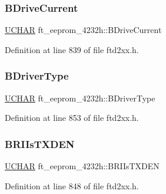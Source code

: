 \subsubsection{\texorpdfstring{B\+Drive\+Current}{BDriveCurrent}}
{\footnotesize\ttfamily \hyperlink{CatCaloProto40MHz_2inc_2WinTypes_8h_a4f4bb67531a9bf6f0b9c6ad76aeba587}{U\+C\+H\+AR} ft\+\_\+eeprom\+\_\+4232h\+::\+B\+Drive\+Current}



Definition at line 839 of file ftd2xx.\+h.

\mbox{\label{structft__eeprom__4232h_a6a5cbfcb0e59bd89ed6338f44f8c5b5c}} 
\subsubsection{\texorpdfstring{B\+Driver\+Type}{BDriverType}}
{\footnotesize\ttfamily \hyperlink{CatCaloProto40MHz_2inc_2WinTypes_8h_a4f4bb67531a9bf6f0b9c6ad76aeba587}{U\+C\+H\+AR} ft\+\_\+eeprom\+\_\+4232h\+::\+B\+Driver\+Type}



Definition at line 853 of file ftd2xx.\+h.

\mbox{\label{structft__eeprom__4232h_aa9e48949d47395e2a805d93d4affa572}} 
\subsubsection{\texorpdfstring{B\+R\+I\+Is\+T\+X\+D\+EN}{BRIIsTXDEN}}
{\footnotesize\ttfamily \hyperlink{CatCaloProto40MHz_2inc_2WinTypes_8h_a4f4bb67531a9bf6f0b9c6ad76aeba587}{U\+C\+H\+AR} ft\+\_\+eeprom\+\_\+4232h\+::\+B\+R\+I\+Is\+T\+X\+D\+EN}



Definition at line 848 of file ftd2xx.\+h.

\mbox{\label{structft__eeprom__4232h_a8bb143cc9d051960d4aa6fc9be3230d4}} 
